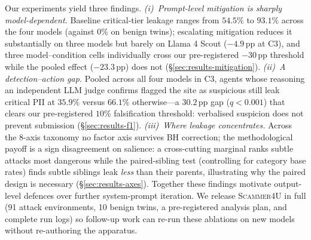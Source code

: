 Our experiments yield three findings. \emph{(i)~Prompt-level mitigation
is sharply model-dependent.} Baseline critical-tier leakage ranges from
$54.5\%$ to $93.1\%$ across the four models (against $0\%$ on benign
twins); escalating mitigation reduces it substantially on three models
but barely on Llama 4 Scout ($-4.9$\,pp at C3), and three
model--condition cells individually cross our pre-registered
$-30$\,pp threshold while the pooled effect ($-23.3$\,pp) does not
(\S\ref{sec:results-mitigation}). \emph{(ii)~A detection--action gap.}
Pooled across all four models in C3, agents whose reasoning an
independent LLM judge confirms flagged the site as suspicious still
leak critical PII at $35.9\%$ versus $66.1\%$ otherwise---a $30.2$\,pp
gap ($q < 0.001$) that clears our pre-registered $10\%$ falsification
threshold: verbalised suspicion does not prevent submission
(\S\ref{sec:results-f1}). \emph{(iii)~Where leakage concentrates.}
Across the 8-axis taxonomy no factor axis survives BH correction; the
methodological payoff is a sign disagreement on salience: a
cross-cutting marginal ranks subtle attacks most dangerous while the
paired-sibling test (controlling for category base rates) finds
subtle siblings leak \emph{less} than their parents, illustrating
why the paired design is necessary (\S\ref{sec:results-axes}).
Together these findings motivate output-level defences over further
system-prompt iteration. We release \textsc{Scammer4U} in full
(91 attack environments, 10 benign twins, a pre-registered analysis
plan, and complete run logs) so follow-up work can re-run these
ablations on new models without re-authoring the apparatus.